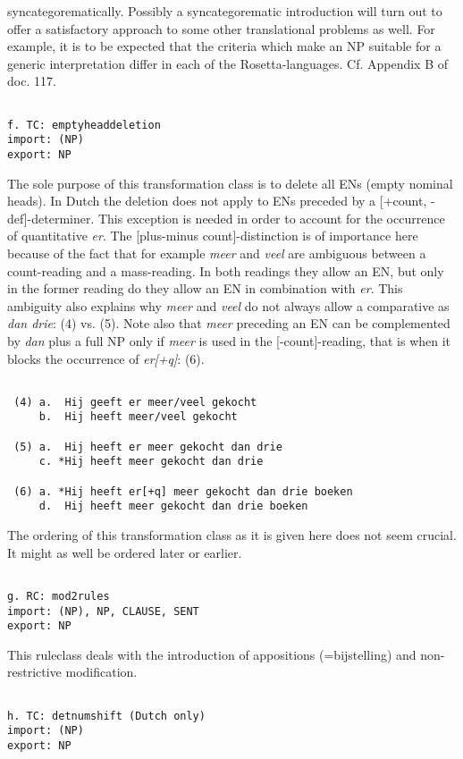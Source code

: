 syncategorematically. Possibly a syncategorematic introduction will turn out to
offer a satisfactory approach to some other translational problems as well. For
example, it is to be expected that the criteria which make an NP suitable for a
generic interpretation differ in each of the Rosetta-languages. Cf. 
Appendix B of doc. 117.
\begin{verbatim}

f. TC: emptyheaddeletion
import: (NP)
export: NP
\end{verbatim}
The sole purpose of this transformation class is to delete all ENs (empty
nominal heads). In Dutch the deletion does not apply to ENs
preceded by a [+count, -def]-determiner. This exception is needed
in order to account for the occurrence of quantitative {\em er}. The
[plus-minus count]-distinction is 
of importance here because of the fact that for
example {\em meer} and {\em veel} are ambiguous between a count-reading and a 
mass-reading. In both readings they allow an EN, but only in the former
reading do they allow an EN in combination 
with {\em er}. This ambiguity also explains why {\em meer} and {\em veel} do not always
allow a comparative as {\em dan drie}: (4) vs. (5). 
Note also that {\em meer} preceding an EN
can be
complemented by {\em dan} plus a full NP only if {\em meer} is used in the 
[-count]-reading, that is when it blocks the occurrence of {\em er[+q]}: (6).
\begin{verbatim}

 (4) a.  Hij geeft er meer/veel gekocht
     b.  Hij heeft meer/veel gekocht 

 (5) a.  Hij heeft er meer gekocht dan drie
     c. *Hij heeft meer gekocht dan drie

 (6) a. *Hij heeft er[+q] meer gekocht dan drie boeken 
     d.  Hij heeft meer gekocht dan drie boeken 

\end{verbatim}
The ordering of this transformation class 
as it is given here does not seem crucial. It
might as well be ordered later or earlier.
\begin{verbatim}

g. RC: mod2rules 
import: (NP), NP, CLAUSE, SENT
export: NP 
\end{verbatim}
This ruleclass deals with the 
introduction of appositions (=bijstelling) and non-restrictive 
modification.
\begin{verbatim}

h. TC: detnumshift (Dutch only)
import: (NP)
export: NP
\end{verbatim}
